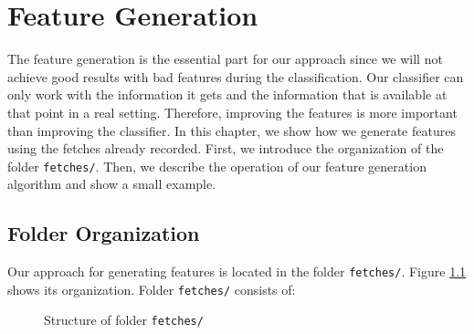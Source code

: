 \chapter{Feature Generation}
\label{chap:feature_generation}

The feature generation is the essential part for our approach since we will not achieve good results with bad features during the classification. Our classifier can only work with the information it gets and the information that is available at that point in a real setting. Therefore, improving the features is more important than improving the classifier. In this chapter, we show how we generate features using the fetches already recorded. First, we introduce the organization of the folder \texttt{fetches/}. Then, we describe the operation of our feature generation algorithm and show a small example.

\section{Folder Organization}
\label{sec:feature_folder}

Our approach for generating features is located in the folder \texttt{fetches/}. Figure \ref{fig:fetchesOrdering} shows its organization. Folder \texttt{fetches/} consists of:

\begin{figure}
\caption{Structure of folder \texttt{fetches/}}
\label{fig:fetchesOrdering}
\end{figure}

